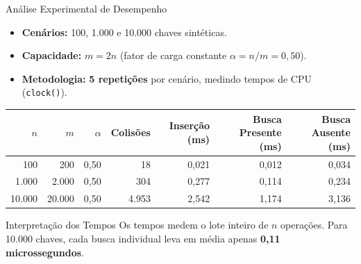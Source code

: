 \documentclass[aspectratio=169,11pt]{beamer}
\begin{document}
\begin{frame}{Análise Experimental de Desempenho}
  \small
  \begin{itemize}
    \item \textbf{Cenários:} 100, 1.000 e 10.000 chaves sintéticas.
    \item \textbf{Capacidade:} $m = 2n$ (fator de carga constante $\alpha = n/m = 0,50$).
    \item \textbf{Metodologia:} \textbf{5 repetições} por cenário, medindo tempos de CPU (\texttt{clock()}).
  \end{itemize}

  \vspace{-0.5em}
  \scriptsize
  \setlength{\tabcolsep}{4pt}
  \renewcommand{\arraystretch}{1.2}
  \begin{table}
    \centering
    \begin{tabular}{rrrrrrr}
      \toprule
      \textbf{$n$} & \textbf{$m$} & \textbf{$\alpha$} & \textbf{Colisões} & \textbf{Inserção (ms)} & \textbf{Busca Presente (ms)} & \textbf{Busca Ausente (ms)} \\
      \midrule
      100    & 200    & 0,50 & 18    & 0,021 & 0,012 & 0,034 \\
      1.000  & 2.000  & 0,50 & 304   & 0,277 & 0,114 & 0,234 \\
      10.000 & 20.000 & 0,50 & 4.953 & 2,542 & 1,174 & 3,136 \\
      \bottomrule
    \end{tabular}
  \end{table}

  \normalsize
  \vspace{-0.5em}
  \begin{block}{Interpretação dos Tempos}
    Os tempos medem o lote inteiro de $n$ operações. Para 10.000 chaves, cada busca individual leva em média apenas \textbf{0,11 microssegundos}.
  \end{block}
\end{frame}
\end{document}
